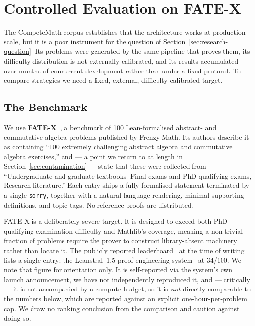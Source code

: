 \documentclass[12pt, a4paper]{article}
\begin{document}
\section{Controlled Evaluation on FATE-X}
\label{sec:results-fatex}

The CompeteMath corpus establishes that the architecture works at
production scale, but it is a poor instrument for the question of
Section~\ref{sec:research-question}. Its problems were generated by the same
pipeline that proves them, its difficulty distribution is not externally
calibrated, and its results accumulated over months of concurrent
development rather than under a fixed protocol. To compare strategies we
need a fixed, external, difficulty-calibrated target.

\subsection{The Benchmark}

We use \textbf{FATE-X}~\cite{fatex2025}, a benchmark of 100 Lean-formalised
abstract- and commutative-algebra problems published by Frenzy Math. Its
authors describe it as containing ``100 extremely challenging abstract
algebra and commutative algebra exercises,'' and --- a point we return to at
length in Section~\ref{sec:contamination} --- state that these were
collected from ``Undergraduate and graduate textbooks, Final exams and PhD
qualifying exams, Research literature.'' Each entry ships a fully
formalised statement terminated by a single \texttt{sorry}, together with a
natural-language rendering, minimal supporting definitions, and topic tags.
No reference proofs are distributed.

FATE-X is a deliberately severe target. It is designed to exceed both PhD
qualifying-examination difficulty and Mathlib's coverage, meaning a
non-trivial fraction of problems require the prover to construct
library-absent machinery rather than locate it. The publicly reported
leaderboard~\cite{benchmarklist_fatex} at the time of writing lists a single
entry: the Leanstral~1.5 proof-engineering system~\cite{leanstral2026} at
34/100. We note that figure for orientation only. It is self-reported via
the system's own launch announcement, we have not independently reproduced
it, and --- critically --- it is not accompanied by a compute budget, so it
is \emph{not} directly comparable to the numbers below, which are reported
against an explicit one-hour-per-problem cap. We draw no ranking conclusion
from the comparison and caution against doing so.
\end{document}
